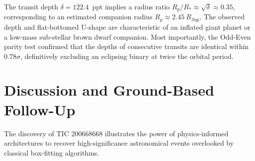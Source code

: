 \documentclass[11pt,a4paper]{article}
\begin{document}
\begin{table}[ht]
\centering
\caption{Derived transit parameters and Robovetter diagnostic results for TIC 200668668.}
\label{tab:transit_params}
\end{table}

The transit depth $\delta = 122.4$~ppt implies a radius ratio $R_p / R_* \approx \sqrt{\delta} \approx 0.35$, corresponding to an estimated companion radius $R_p \approx 2.45~R_{\text{Jup}}$. The observed depth and flat-bottomed U-shape are characteristic of an inflated giant planet or a low-mass sub-stellar brown dwarf companion. Most importantly, the Odd-Even parity test confirmed that the depths of consecutive transits are identical within $0.78\sigma$, definitively excluding an eclipsing binary at twice the orbital period.

\section{Discussion and Ground-Based Follow-Up}

The discovery of TIC 200668668 illustrates the power of physics-informed architectures to recover high-significance astronomical events overlooked by classical box-fitting algorithms. 
\end{document}
